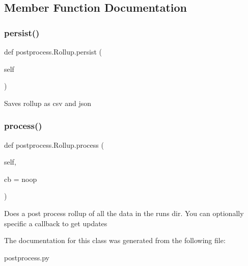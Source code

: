 \subsection{Member Function Documentation}
\mbox{\label{classpostprocess_1_1_rollup_a796206a71cbfbec7104b6da466aa18e5}} 
\subsubsection{\texorpdfstring{persist()}{persist()}}
{\footnotesize\ttfamily def postprocess.\+Rollup.\+persist (\begin{DoxyParamCaption}\item[{}]{self }\end{DoxyParamCaption})}

\begin{DoxyVerb}Saves rollup as csv and json
\end{DoxyVerb}
 \mbox{\label{classpostprocess_1_1_rollup_a8145f33f9c53fcf556a8c525026461d4}} 
\subsubsection{\texorpdfstring{process()}{process()}}
{\footnotesize\ttfamily def postprocess.\+Rollup.\+process (\begin{DoxyParamCaption}\item[{}]{self,  }\item[{}]{cb = {\ttfamily noop} }\end{DoxyParamCaption})}

\begin{DoxyVerb}Does a post process rollup of all the data in the runs dir.  You can optionally specific a callback to get updates
\end{DoxyVerb}
 

The documentation for this class was generated from the following file\+:\begin{DoxyCompactItemize}
\item 
postprocess.\+py\end{DoxyCompactItemize}
